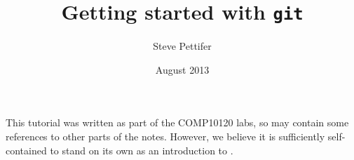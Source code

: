 \documentclass[11pt, a4paper]{report}
\title{Getting started with \texttt{git}}
\date{August 2013}
\author{Steve Pettifer}%
\begin{document}
\maketitle

This tutorial was written as part of the COMP10120 labs, so may contain some references to other parts of the notes. However, we believe it is sufficiently self-contained to stand on its own as an introduction to .


\printbibliography
\end{document}
